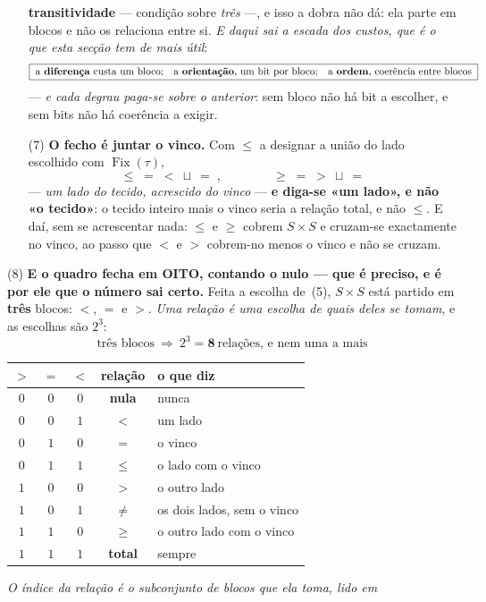\documentclass[livro.tex]{subfiles}
\begin{document}
\begin{teorema}
\begin{enumerate}
\textbf{transitividade} --- condição sobre \emph{três} ---, e isso a dobra não
dá: ela parte em blocos e não os relaciona entre si. \emph{E daqui sai a escada
dos custos, que é o que esta secção tem de mais útil}:
\[
\boxed{\;\text{a \textbf{diferença} custa um bloco;\quad a \textbf{orientação}, um bit por bloco;\quad a \textbf{ordem}, coerência entre blocos}\;}
\]
--- \emph{e cada degrau paga-se sobre o anterior}: sem bloco não há bit a
escolher, e sem bits não há coerência a exigir.
\item[(7)] \textbf{O fecho é juntar o vinco.} Com $\le$ a designar a união do
lado escolhido com $\operatorname{Fix}(\tau)$,
\[
\boxed{\;\le\;=\;<\ \sqcup\ =\;,\qquad\qquad \ge\;=\;>\ \sqcup\ =\;}
\]
--- \emph{um lado do tecido, acrescido do vinco} --- \textbf{e diga-se «um lado»,
e não «o tecido»}: o tecido inteiro mais o vinco seria a relação total, e não
$\le$. E daí, sem se acrescentar nada:
$\le$ e $\ge$ cobrem $S\times S$ e cruzam-se exactamente no vinco, ao passo que
$<$ e $>$ cobrem-no menos o vinco e não se cruzam.
\end{enumerate}
\item[(8)] \textbf{E o quadro fecha em OITO, contando o nulo --- que é preciso, e
é por ele que o número sai certo.} Feita a escolha de~(5), $S\times S$ está
partido em \textbf{três} blocos: $<$, $=$ e $>$. \emph{Uma relação é uma escolha
de quais deles se tomam}, e as escolhas são $2^{3}$:
\[
\boxed{\;\text{três blocos}\ \Longrightarrow\ 2^{3}=\mathbf{8}\ \text{relações, e nem uma a mais}\;}
\]
\begin{center}\small
\begin{tabular}{@{}ccccl@{}}
\toprule
$>$ & $=$ & $<$ & relação & o que diz \\
\midrule
$0$&$0$&$0$ & \textbf{nula} & nunca \\
$0$&$0$&$1$ & $<$ & um lado \\
$0$&$1$&$0$ & $=$ & o vinco \\
$0$&$1$&$1$ & $\le$ & o lado com o vinco \\
$1$&$0$&$0$ & $>$ & o outro lado \\
$1$&$0$&$1$ & $\neq$ & os dois lados, sem o vinco \\
$1$&$1$&$0$ & $\ge$ & o outro lado com o vinco \\
$1$&$1$&$1$ & \textbf{total} & sempre \\
\bottomrule
\end{tabular}
\end{center}
\emph{O índice da relação é o subconjunto de blocos que ela toma, lido em
}
\end{teorema}
\end{document}
